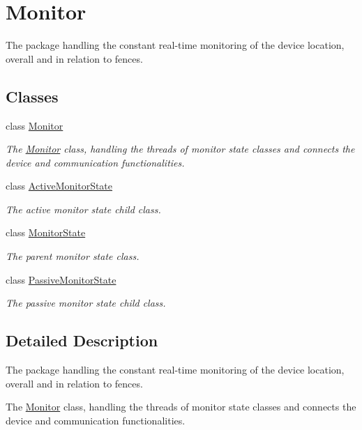 \hypertarget{group___monitor}{}\section{Monitor}
\label{group___monitor}


The package handling the constant real-\/time monitoring of the device location, overall and in relation to fences.  


\subsection*{Classes}
\begin{DoxyCompactItemize}
\item 
class \hyperlink{class_monitor}{Monitor}
\begin{DoxyCompactList}\small\item\em The \hyperlink{class_monitor}{Monitor} class, handling the threads of monitor state classes and connects the device and communication functionalities. \end{DoxyCompactList}\item 
class \hyperlink{class_active_monitor_state}{Active\+Monitor\+State}
\begin{DoxyCompactList}\small\item\em The active monitor state child class. \end{DoxyCompactList}\item 
class \hyperlink{class_monitor_state}{Monitor\+State}
\begin{DoxyCompactList}\small\item\em The parent monitor state class. \end{DoxyCompactList}\item 
class \hyperlink{class_passive_monitor_state}{Passive\+Monitor\+State}
\begin{DoxyCompactList}\small\item\em The passive monitor state child class. \end{DoxyCompactList}\end{DoxyCompactItemize}


\subsection{Detailed Description}
The package handling the constant real-\/time monitoring of the device location, overall and in relation to fences. 

The \hyperlink{class_monitor}{Monitor} class, handling the threads of monitor state classes and connects the device and communication functionalities.

